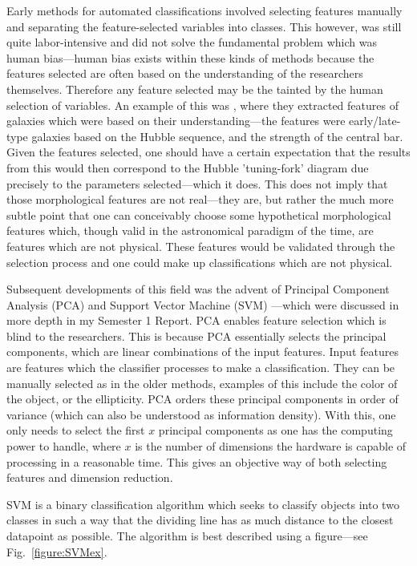 \documentclass[a4paper,fleqn,usenatbib]{mnras}
\begin{document}
Early methods for automated classifications involved selecting features manually and separating the feature-selected variables into classes. This however, was still quite labor-intensive and did not solve the fundamental problem which was human bias---human bias exists within these kinds of methods because the features selected are often based on the understanding of the researchers themselves. Therefore any feature selected may be the tainted by the human selection of variables. An example of this was \citet{Abraham2000}, where they extracted features of galaxies which were based on their understanding---the features were early/late-type galaxies based on the Hubble sequence, and the strength of the central bar. Given the features selected, one should have a certain expectation that the results from this would then correspond to the Hubble 'tuning-fork' diagram due precisely to the parameters selected---which it does. This does not imply that those morphological features are not real---they are, but rather the much more subtle point that one can conceivably choose some hypothetical morphological features which, though valid in the astronomical paradigm of the time, are features which are not physical. These features would be validated through the selection process and one could make up classifications which are not physical. 

Subsequent developments of this field was the advent of Principal Component Analysis (PCA) \citep{PCA} and Support Vector Machine (SVM) \citep{SVM}---which were discussed in more depth in my Semester 1 Report. PCA enables feature selection which is blind to the researchers. This is because PCA essentially selects the principal components, which are linear combinations of the input features. Input features are features which the classifier processes to make a classification. They can be manually selected as in the older methods, examples of this include the color of the object, or the ellipticity. PCA orders these principal components in order of variance (which can also be understood as information density). With this, one only needs to select the first $x$ principal components as one has the computing power to handle, where $x$ is the number of dimensions the hardware is capable of processing in a reasonable time. This gives an objective way of both selecting features and dimension reduction. 

SVM is a binary classification algorithm which seeks to classify objects into two classes in such a way that the dividing line has as much distance to the closest datapoint as possible. The algorithm is best described using a figure---see Fig.~\ref{figure:SVMex}. \citep{SVM}
\end{document}
